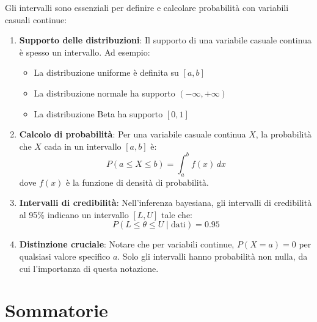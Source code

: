 \documentclass[
  italian,
  letterpaper,
  a4paper,
  11pt,
  open=any]{scrbook}
\providecommand{\tightlist}{%
  \setlength{\itemsep}{0pt}\setlength{\parskip}{0pt}}
\theoremstyle{plain}
\theoremstyle{definition}
\theoremstyle{definition}
\theoremstyle{remark}
\begin{document}
\begin{tcolorbox}[enhanced jigsaw, arc=.35mm, bottomrule=.15mm, bottomtitle=1mm, breakable, colback=white, colbacktitle=quarto-callout-important-color!10!white, colframe=quarto-callout-important-color-frame, coltitle=black, left=2mm, leftrule=.75mm, opacityback=0, opacitybacktitle=0.6, rightrule=.15mm, title=\textcolor{quarto-callout-important-color}{\faExclamation}\hspace{0.5em}{Perché gli intervalli sono fondamentali per la probabilità}, titlerule=0mm, toprule=.15mm, toptitle=1mm]

Gli intervalli sono essenziali per definire e calcolare probabilità con
variabili casuali continue:

\begin{enumerate}
\def\labelenumi{\arabic{enumi}.}
\item
  \textbf{Supporto delle distribuzioni}: Il supporto di una variabile
  casuale continua è spesso un intervallo. Ad esempio:

  \begin{itemize}
  \tightlist
  \item
    La distribuzione uniforme è definita su \([a, b]\)
  \item
    La distribuzione normale ha supporto \((-\infty, +\infty)\)
  \item
    La distribuzione Beta ha supporto \([0, 1]\)
  \end{itemize}
\item
  \textbf{Calcolo di probabilità}: Per una variabile casuale continua
  \(X\), la probabilità che \(X\) cada in un intervallo \([a, b]\) è: \[
  P(a \leq X \leq b) = \int_a^b f(x) \, dx
  \] dove \(f(x)\) è la funzione di densità di probabilità.
\item
  \textbf{Intervalli di credibilità}: Nell'inferenza bayesiana, gli
  intervalli di credibilità al 95\% indicano un intervallo \([L, U]\)
  tale che: \[
  P(L \leq \theta \leq U \mid \text{dati}) = 0.95
  \]
\item
  \textbf{Distinzione cruciale}: Notare che per variabili continue,
  \(P(X = a) = 0\) per qualsiasi valore specifico \(a\). Solo gli
  intervalli hanno probabilità non nulla, da cui l'importanza di questa
  notazione.
\end{enumerate}

\end{tcolorbox}

\chapter{Sommatorie}\label{sec-apx-sums}
\end{document}
